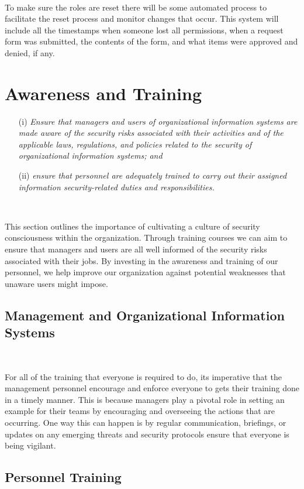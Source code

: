 \documentclass[12pt,a4paper]{report}
\begin{document}
\

To make sure the roles are reset there will be some automated process to facilitate the reset process and monitor changes that occur.
This system will include all the timestamps when someone lost all permissions, when a request form was submitted, the contents of the form, and what items were approved and denied, if any.

\chapter{Awareness and Training}
\begin{enumerate}
\item[(i)] \textit{Ensure that managers and users of organizational information systems are made aware of the security risks associated with their activities and of the applicable laws, regulations, and policies related to the security of organizational information systems; and}
\item[(ii)]	\textit{ensure that personnel are adequately trained to carry out their assigned information security-related duties and responsibilities.}
\end{enumerate}

\

This section outlines the importance of cultivating a culture of security consciousness within the organization. 
Through training courses we can aim to ensure that managers and users are all well informed of the security risks associated with their jobs. 
By investing in the awareness and training of our personnel, we help improve our organization against potential weaknesses that unaware users might impose.

\section{Management and Organizational Information Systems}
\

For all of the training that everyone is required to do, its imperative that the management personnel encourage and enforce everyone to gets their training done in a timely manner.
This is because managers play a pivotal role in setting an example for their teams by encouraging and overseeing the actions that are occurring. 
One way this can happen is by regular communication, briefings, or updates on any emerging threats and security protocols ensure that everyone is being vigilant.

\section{Personnel Training}
\
\end{document}
